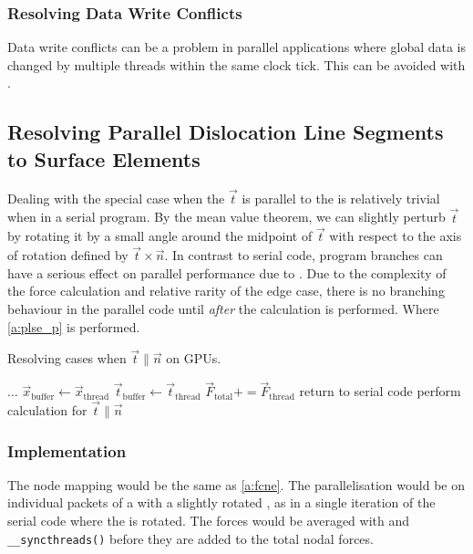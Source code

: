 \subsubsection{Resolving Data Write Conflicts}
Data write conflicts can be a problem in parallel applications where global data is changed by multiple threads within the same clock tick. This can be avoided with .
%
\subsection[Parallel Dislocation Line Segments to Surface Elements]{Resolving Parallel Dislocation Line Segments to Surface Elements}
%
Dealing with the special case when the  $ \vec{t} $ is parallel to the  is relatively trivial when in a serial program. By the mean value theorem, we can slightly perturb $ \vec{t} $ by rotating it by a small angle around the midpoint of $ \vec{t} $ with respect to the axis of rotation defined by $ \vec{t} \times \vec{n} $. In contrast to serial code, program branches can have a serious effect on parallel performance due to . Due to the complexity of the force calculation and relative rarity of the edge case, there is no branching behaviour in the parallel code until \emph{after} the calculation is performed. Where \cref{a:plse_p} is performed.
\begin{algorithm}
	\caption{Resolving cases when $ \vec{t} \parallel \vec{n} $ on GPUs.}
	\label{a:plse_p}
	\begin{algorithmic}
		\State $ \ldots $
		\State $ \vec{x}_{\textrm{buffer}} \gets \vec{x}_{\textrm{thread}} $
		\State $ \vec{t}_{\textrm{buffer}} \gets \vec{t}_{\textrm{thread}} $
		\Else
		\State $ \vec{F}_{\textrm{total}} += \vec{F}_{\textrm{thread}} $
		\EndIf
		\EndFor
		\State return to serial code
		\State perform calculation for $ \vec{t} \parallel \vec{n} $
		\EndFor
		\EndIf
	\end{algorithmic}
\end{algorithm}
\subsubsection{Implementation}
The node mapping would be the same as \cref{a:fcne}. The parallelisation would be on individual packets of a  with a slightly rotated , as in a single iteration of the serial code where the  is rotated. The forces would be averaged with  and \texttt{__syncthreads()} before they are added to the total nodal forces.

